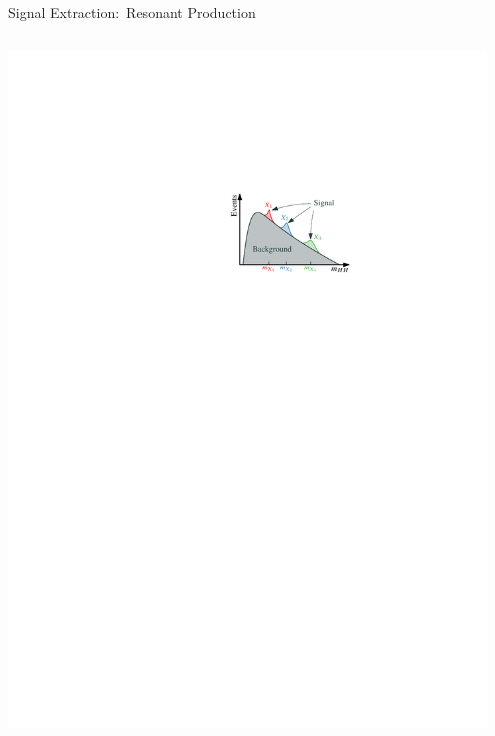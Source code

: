 \documentclass[11pt, xcolor={dvipsnames}, aspectratio=169, notes]{beamer}
\begin{document}
\begin{frame}{Signal Extraction:\ Resonant \allbold{\HH} Production}
\begin{columns}[onlytextwidth]
    \includegraphics[width=0.95\textwidth]{resonant_signal_extraction_illustration}
  \end{columns}
\end{frame}


\end{document}
